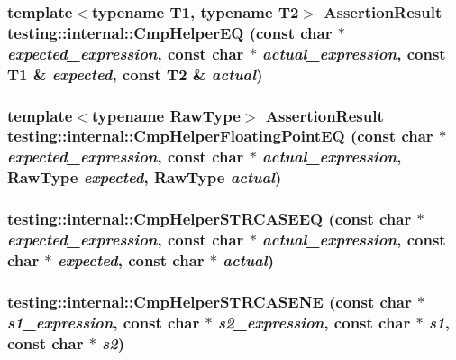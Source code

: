 \subsubsection{\setlength{\rightskip}{0pt plus 5cm}template$<$typename T1, typename T2$>$ {\bf AssertionResult} testing::internal::CmpHelperEQ (const char $\ast$ {\em expected\_\-expression}, const char $\ast$ {\em actual\_\-expression}, const T1 \& {\em expected}, const T2 \& {\em actual})\hspace{0.3cm}{\tt  [inline]}}\label{namespacetesting_1_1internal_45932ad30a954e99267502602cb8f7d4}


\subsubsection{\setlength{\rightskip}{0pt plus 5cm}template$<$typename RawType$>$ {\bf AssertionResult} testing::internal::CmpHelperFloatingPointEQ (const char $\ast$ {\em expected\_\-expression}, const char $\ast$ {\em actual\_\-expression}, RawType {\em expected}, RawType {\em actual})\hspace{0.3cm}{\tt  [inline]}}\label{namespacetesting_1_1internal_0cbdac3d4f193f9e41b888a23967ce49}


\subsubsection{ testing::internal::CmpHelperSTRCASEEQ (const char $\ast$ {\em expected\_\-expression}, const char $\ast$ {\em actual\_\-expression}, const char $\ast$ {\em expected}, const char $\ast$ {\em actual})}\label{namespacetesting_1_1internal_d8dddafb54dad2b1aba566a0d5dbbe5c}


\subsubsection{ testing::internal::CmpHelperSTRCASENE (const char $\ast$ {\em s1\_\-expression}, const char $\ast$ {\em s2\_\-expression}, const char $\ast$ {\em s1}, const char $\ast$ {\em s2})}\label{namespacetesting_1_1internal_33d1ce02617d6effefd951178e5036a9}


